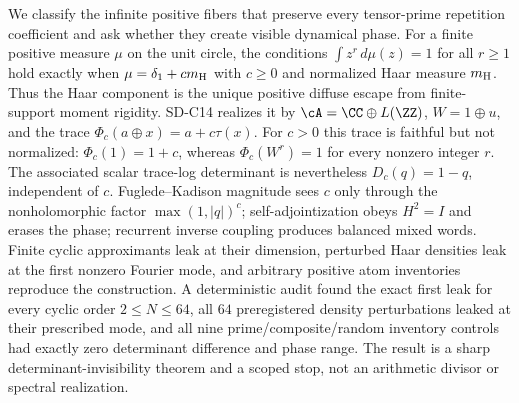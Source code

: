 We classify the infinite positive fibers that preserve every tensor-prime
repetition coefficient and ask whether they create visible dynamical phase.
For a finite positive measure $\mu$ on the unit circle, the conditions
$\int z^r\,d\mu(z)=1$ for all $r\ge1$ hold exactly when
$\mu=\delta_1+c m_{\rm H}$ with $c\ge0$ and normalized Haar measure
$m_{\rm H}$.  Thus the Haar component is the unique positive diffuse escape
from finite-support moment rigidity.  SD-C14 realizes it by
$\cA=\CC\oplus L(\ZZ)$, $W=1\oplus u$, and the trace
$\Phi_c(a\oplus x)=a+c\tau(x)$.  For $c>0$ this trace is faithful but not
normalized: $\Phi_c(1)=1+c$, whereas $\Phi_c(W^r)=1$ for every nonzero
integer $r$.  The associated scalar trace-log determinant is nevertheless
$D_c(q)=1-q$, independent of $c$.  Fuglede--Kadison magnitude sees $c$ only
through the nonholomorphic factor $\max(1,|q|)^c$; self-adjointization obeys
$H^2=I$ and erases the phase; recurrent inverse coupling produces balanced
mixed words.  Finite cyclic approximants leak at their dimension, perturbed
Haar densities leak at the first nonzero Fourier mode, and arbitrary positive
atom inventories reproduce the construction.  A deterministic audit found
the exact first leak for every cyclic order $2\leq N\leq64$, all $64$
preregistered density perturbations leaked at their prescribed mode, and all
nine prime/composite/random inventory controls had exactly zero determinant
difference and phase range.  The result is a sharp
determinant-invisibility theorem and a scoped stop, not an arithmetic divisor
or spectral realization.
